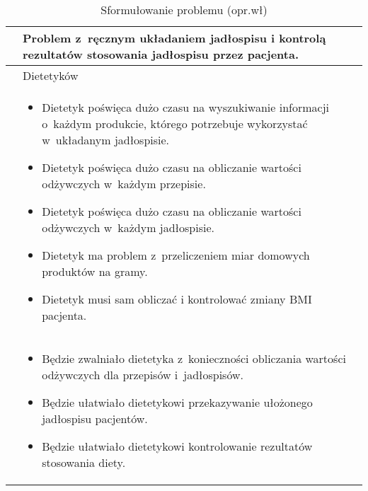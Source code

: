 \begin{minipage}{\textwidth}
    \begin{table}[H]
        \centering\caption{Sformułowanie problemu (opr.wł)\label{tabela:sformulowanie-problemu}}
        \begin{tabular}{|P{.2\textwidth}|p{.7\textwidth}|}

            \hline
             &
            Problem z~ręcznym układaniem jadłospisu i kontrolą rezultatów stosowania jadłospisu przez pacjenta. \\
            \hline

             &
            Dietetyków \\
            \hline

             &
            \begin{itemize}
                \item Dietetyk poświęca dużo czasu na wyszukiwanie informacji o~każdym produkcie, którego potrzebuje wykorzystać w~układanym jadłospisie.
                \item Dietetyk poświęca dużo czasu na obliczanie wartości odżywczych w~każdym przepisie.
                \item Dietetyk poświęca dużo czasu na obliczanie wartości odżywczych w~każdym jadłospisie.
                \item Dietetyk ma problem z~przeliczeniem miar domowych produktów na gramy.
                \item Dietetyk musi sam obliczać i kontrolować zmiany BMI pacjenta.
            \end{itemize} \\
            \hline

             &
            \begin{itemize}
                \item Będzie zwalniało dietetyka z~konieczności obliczania wartości odżywczych dla przepisów i~jadłospisów.
                \item Będzie ułatwiało dietetykowi przekazywanie ułożonego jadłospisu pacjentów.
                \item Będzie ułatwiało dietetykowi kontrolowanie rezultatów stosowania diety.
            \end{itemize} \\
            \hline
        \end{tabular}
    \end{table}
\end{minipage}
